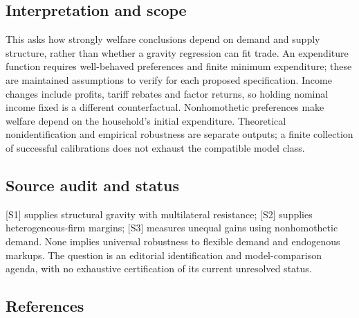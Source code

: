 \documentclass[11pt,a4paper]{article}
\begin{document}
\subsection*{Interpretation and scope}
This asks how strongly welfare conclusions depend on demand and supply structure, rather than whether a gravity regression can fit trade. An expenditure function requires well-behaved preferences and finite minimum expenditure; these are maintained assumptions to verify for each proposed specification. Income changes include profits, tariff rebates and factor returns, so holding nominal income fixed is a different counterfactual. Nonhomothetic preferences make welfare depend on the household’s initial expenditure. Theoretical nonidentification and empirical robustness are separate outputs; a finite collection of successful calibrations does not exhaust the compatible model class.

\subsection*{Source audit and status}
[S1] supplies structural gravity with multilateral resistance; [S2] supplies heterogeneous-firm margins; [S3] measures unequal gains using nonhomothetic demand. None implies universal robustness to flexible demand and endogenous markups. The question is an editorial identification and model-comparison agenda, with no exhaustive certification of its current unresolved status.

\subsection*{References}
\end{document}
